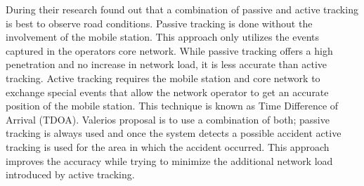 During their research found out that a combination of passive and active tracking is best to observe road conditions. Passive tracking is done without the involvement of the mobile station. This approach only utilizes the events captured in the operators core network. While passive tracking offers a high penetration and no increase in network load, it is less accurate than active tracking. Active tracking requires the mobile station and core network to exchange special events that allow the network operator to get an accurate position of the mobile station. This technique is known as Time Difference of Arrival (TDOA). Valerios proposal is to use a combination of both; passive tracking is always used and once the system detects a possible accident active tracking is used for the area in which the accident occurred. This approach improves the accuracy while trying to minimize the additional network load introduced by active tracking.


